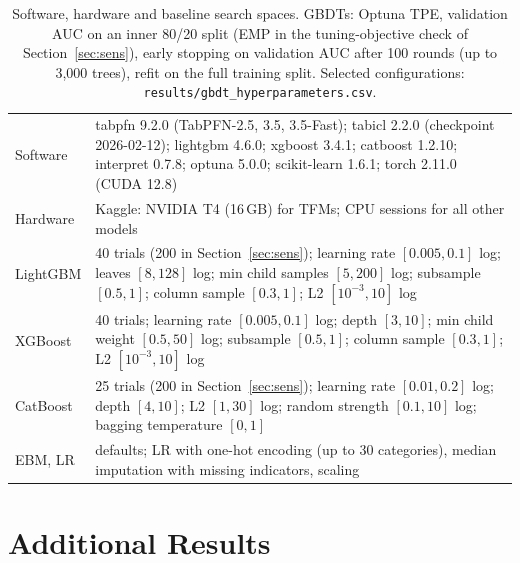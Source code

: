 \documentclass[11pt]{article}
\newcommand{\tfms}{TFMs\xspace}
\begin{document}
\begin{table}[h]
\caption{Software, hardware and baseline search spaces. GBDTs: Optuna TPE, validation AUC on an inner 80/20 split
(EMP in the tuning-objective check of Section~\ref{sec:sens}), early stopping on validation AUC after 100 rounds (up to
3,000 trees), refit on the full training split. Selected configurations: \texttt{results/gbdt\_hyperparameters.csv}.}
\label{tab:repro}
\centering\scriptsize
\begin{tabular}{@{}p{}p{}@{}}
\toprule
Software & tabpfn 9.2.0 (TabPFN-2.5, 3.5, 3.5-Fast); tabicl 2.2.0 (checkpoint 2026-02-12); lightgbm 4.6.0; xgboost 3.4.1;
catboost 1.2.10; interpret 0.7.8; optuna 5.0.0; scikit-learn 1.6.1; torch 2.11.0 (CUDA 12.8) \\
Hardware & Kaggle: NVIDIA T4 (16\,GB) for \tfms; CPU sessions for all other models \\
LightGBM & 40 trials (200 in Section~\ref{sec:sens}); learning rate $[0.005, 0.1]$ log; leaves $[8, 128]$ log; min child
samples $[5, 200]$ log; subsample $[0.5, 1]$; column sample $[0.3, 1]$; L2 $[10^{-3}, 10]$ log \\
XGBoost & 40 trials; learning rate $[0.005, 0.1]$ log; depth $[3, 10]$; min child weight $[0.5, 50]$ log; subsample
$[0.5, 1]$; column sample $[0.3, 1]$; L2 $[10^{-3}, 10]$ log \\
CatBoost & 25 trials (200 in Section~\ref{sec:sens}); learning rate $[0.01, 0.2]$ log; depth $[4, 10]$; L2 $[1, 30]$
log; random strength $[0.1, 10]$ log; bagging temperature $[0, 1]$ \\
EBM, LR & defaults; LR with one-hot encoding (up to 30 categories), median imputation with missing indicators, scaling \\
\bottomrule
\end{tabular}
\end{table}

\section{Additional Results}
\end{document}
